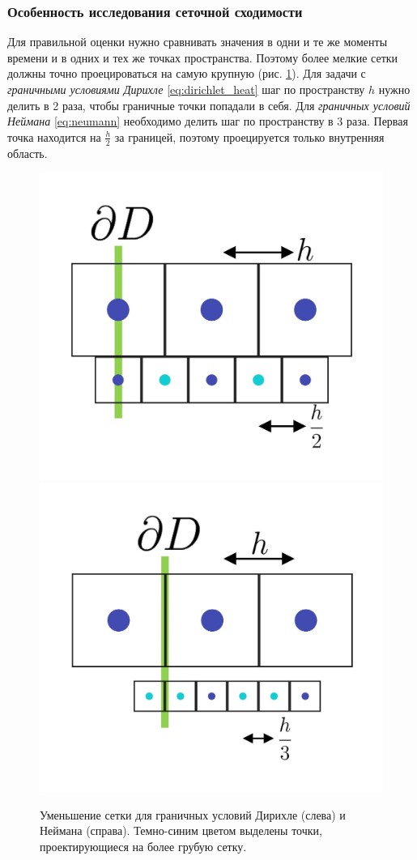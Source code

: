 \subsubsection*{Особенность исследования сеточной сходимости}
Для правильной оценки нужно сравнивать значения в одни и те же моменты времени и в одних и тех же точках пространства. Поэтому более мелкие сетки должны точно проецироваться на самую крупную (рис. \ref{fig:convergence_bounds}). Для задачи с \textit{граничными условиями Дирихле} \eqref{eq:dirichlet_heat} шаг по пространству $h$ нужно делить в 2 раза, чтобы граничные точки попадали в себя. Для \textit{граничных условий Неймана} \eqref{eq:neumann} необходимо делить шаг по пространству в 3 раза. Первая точка находится на $\frac{h}{2}$ за границей, поэтому проецируется только внутренняя область.
\begin{figure}[H]
\centering
\includegraphics[width=.5\textwidth]{common_images/dividing_dirichlet.jpg}\hfill
\includegraphics[width=.5\textwidth]{common_images/dividing_neumann.jpg}
\caption{Уменьшение сетки для граничных условий Дирихле (слева) и Неймана (справа). Темно-синим цветом выделены точки, проектирующиеся на более грубую сетку.}
\label{fig:convergence_bounds}
\end{figure}



